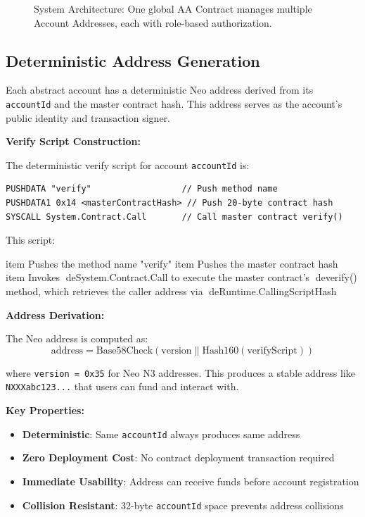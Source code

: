 \documentclass[10pt,twocolumn]{article}
\newcommand{\code}[1]{\texttt{\small #1}}
\begin{document}
{\begin{figure}[t]
\begin{tikzpicture}
\end{tikzpicture}
\caption{System Architecture: One global AA Contract manages multiple Account Addresses, each with role-based authorization.}
\label{fig:architecture}
\end{figure}


\subsection{Deterministic Address Generation}

Each abstract account has a deterministic Neo address derived from its \code{accountId} and the master contract hash. This address serves as the account's public identity and transaction signer.

\textbf{Verify Script Construction:}

The deterministic verify script for account \code{accountId} is:

{\small
\begin{verbatim}
PUSHDATA "verify"                  // Push method name
PUSHDATA1 0x14 <masterContractHash> // Push 20-byte contract hash
SYSCALL System.Contract.Call       // Call master contract verify()
\end{verbatim}
}

This script:
\begin{enumerate}[leftmargin=*,topsep=2pt,itemsep=1pt]
item Pushes the method name "verify"
item Pushes the master contract hash
item Invokes de{System.Contract.Call} to execute the master contract's de{verify()} method, which retrieves the caller address via de{Runtime.CallingScriptHash}
\end{enumerate}

\textbf{Address Derivation:}

The Neo address is computed as:
$$\text{address} = \text{Base58Check}(\text{version} \| \text{Hash160}(\text{verifyScript}))$$

where \code{version = 0x35} for Neo N3 addresses. This produces a stable address like \code{NXXXabc123...} that users can fund and interact with.

\textbf{Key Properties:}

\begin{itemize}[leftmargin=*,topsep=2pt,itemsep=1pt]
\item \textbf{Deterministic}: Same \code{accountId} always produces same address
\item \textbf{Zero Deployment Cost}: No contract deployment transaction required
\item \textbf{Immediate Usability}: Address can receive funds before account registration
\item \textbf{Collision Resistant}: 32-byte \code{accountId} space prevents address collisions
\end{itemize}


}
\end{document}
